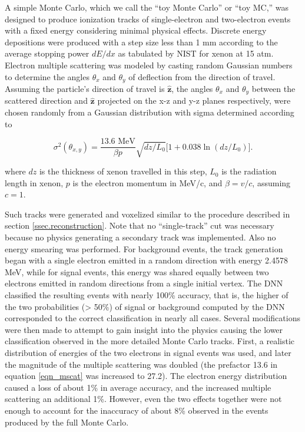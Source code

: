 \documentclass[a4paper,11pt]{article}
\begin{document}
A simple Monte Carlo, which we call the ``toy Monte Carlo'' or ``toy MC,'' was designed to produce ionization tracks of single-electron and two-electron events with a fixed energy
considering minimal physical effects.  Discrete energy depositions were produced with a step size less than 1 mm according to the average stopping power $dE/dx$ as tabulated by
NIST \cite{NIST_mac} for xenon at 15 atm.  Electron multiple scattering was modeled by casting random Gaussian numbers to determine the angles $\theta_{x}$ and $\theta_{y}$ of deflection
from the direction of travel.  Assuming the particle's direction of travel is $\hat{\mathbf{z}}$, the angles $\theta_{x}$ and $\theta_{y}$ between the scattered direction and $\hat{\mathbf{z}}$ projected on 
the x-z and y-z planes respectively, were chosen randomly from a Gaussian distribution with sigma determined according to

\begin{equation}\label{eqn_mscat}
\sigma^{2}(\theta_{x,y}) = \frac{13.6\,\,\mathrm{MeV}}{\beta p}\sqrt{dz/L_{0}}\bigl[1 + 0.038\ln(dz/L_{0})\bigr].
\end{equation}

\noindent where $dz$ is the thickness of xenon travelled in this step, $L_{0}$ is the radiation length in xenon, $p$ is the electron momentum in MeV/c, and $\beta = v/c$, assuming $c = 1$.

Such tracks were generated and voxelized similar to the procedure described in section \ref{ssec.reconstruction}.  Note that no ``single-track'' cut was necessary because no
physics generating a secondary track was implemented.  Also no energy smearing was performed.  For background events, the track generation began with a single electron emitted in a
random direction with energy 2.4578 MeV, while for signal events, this energy was shared equally between two electrons emitted in random directions from a single initial vertex.  The DNN
classified the resulting events with nearly 100\% accuracy, that is, the higher of the two probabilities (> 50\%) of signal or background computed by the DNN corresponded to the correct 
classification in nearly all cases.  Several modifications were then made to attempt to gain insight into the physics causing the lower classification observed in the
more detailed Monte Carlo tracks.  First, a realistic distribution of energies of the two electrons in signal events \cite{Ponkratenko_2000} was used, and later the magnitude of the multiple scattering was doubled (the prefactor 13.6 in equation \ref{eqn_mscat} was increased to 27.2).  The electron energy distribution caused a loss of about 1\% in average accuracy, and the
increased multiple scattering an additional 1\%.  However, even the two effects together were not enough to account for the inaccuracy of about 8\% observed in the events produced by the
full Monte Carlo.
\end{document}
